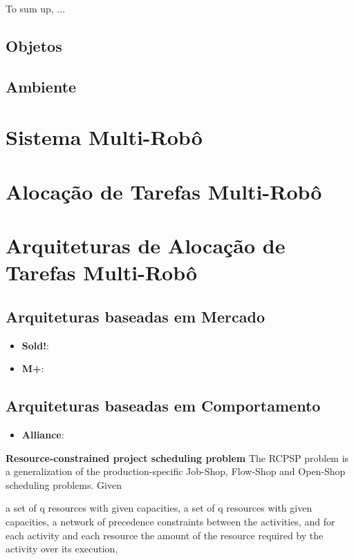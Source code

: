 To sum up, ...


\subsection{Objetos}

\subsection{Ambiente}

\section{Sistema Multi-Robô}

\section{Alocação de Tarefas Multi-Robô}

\section{Arquiteturas de Alocação de Tarefas Multi-Robô}

\subsection{Arquiteturas baseadas em Mercado}

\begin{itemize}
    \item \textbf{Sold!}:
    \item \textbf{M+}:
\end{itemize}

\subsection{Arquiteturas baseadas em Comportamento}

\begin{itemize}
    \item \textbf{Alliance}:
    
\end{itemize}


\textbf{Resource-constrained project scheduling problem}
The RCPSP problem is a generalization of the production-specific Job-Shop, Flow-Shop and Open-Shop scheduling problems. Given

    a set of q resources with given capacities,
    a set of q resources with given capacities,
    a network of precedence constraints between the activities, and
    for each activity and each resource the amount of the resource required by the activity over its execution,

